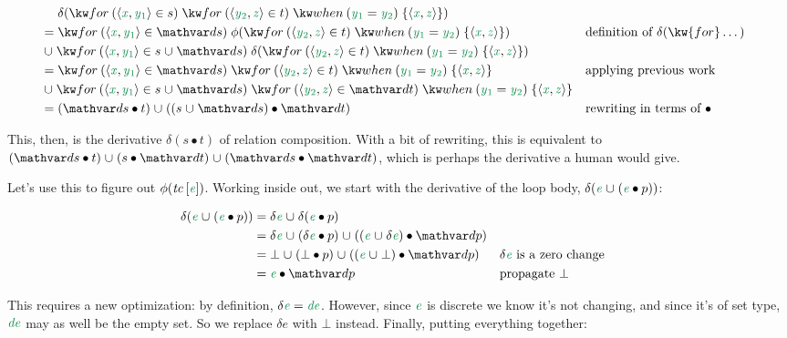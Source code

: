 \begin{align*}
  &\mathrel{\hphantom{=}}
  \delta(
  \eforraw{\etuple{\dvar x, \yone} \in s}
  \eforraw{\etuple{\ytwo, \dvar z} \in t}
  \ewhen{\yone = \ytwo} \esetraw{\etuple{\dvar x, \dvar z}})
  \\
  &= \eforraw{\etuple{\dvar x, \yone} \in \ds}
  \phi(\eforraw{\etuple{\ytwo, \dvar z} \in t}
  \ewhen{\yone = \ytwo} \esetraw{\etuple{\dvar x, \dvar z}})
  && \text{definition of $\delta(\kw{for} \dots)$}
  \\
  &\cup \eforraw{\etuple{\dvar x, \yone} \in s \cup \ds}
  \delta(\eforraw{\etuple{\ytwo, \dvar z} \in t}
  \ewhen{\yone = \ytwo} \esetraw{\etuple{\dvar x, \dvar z}})
  \\
  &= \eforraw{\etuple{\dvar x, \yone} \in \ds}
  \eforraw{\etuple{\ytwo, \dvar z} \in t}
  \ewhen{\yone = \ytwo} \esetraw{\etuple{\dvar x, \dvar z}}
  && \text{applying previous work}
  \\
  &\cup
  \eforraw{\etuple{\dvar x, \yone} \in s \cup \ds}
  \eforraw{\etuple{\ytwo, \dvar z} \in \dt}
  \ewhen{\yone = \ytwo} \esetraw{\etuple{\dvar x, \dvar z}}
  \\
  &= (\ds \bullet t) \cup ((s \cup \ds) \bullet \dt)
  && \text{rewriting in terms of ${\bullet}$}
\end{align*}

\noindent
This, then, is the derivative $\delta(s \bullet t)$ of relation composition.
With a bit of rewriting, this is equivalent to $(\ds \bullet t) \cup (s \bullet
\dt) \cup (\ds \bullet \dt)$, which is perhaps the derivative a human would
give.

Let's use this to figure out $\phi(\name{tc}\<\eboxvar{e})$. Working inside out,
we start with the derivative of the loop body, $\delta(\dvar e \cup (\dvar e
\bullet p))$:

\begin{align*}
  \delta({\dvar e \cup (\dvar e \bullet p)})
  &= \delta\dvar e \cup \delta(\dvar e \bullet p)\\
  &= \delta\dvar e
  \cup (\delta\dvar e \bullet p)
  \cup ((\dvar e \cup \delta\dvar e) \bullet \deep)
  \\
  &= \bot \cup (\bot \bullet p) \cup ((\dvar e \cup \bot) \bullet \deep)
  && \delta\dvar e ~\text{is a zero change}
  \\
  &= \dvar e \bullet \deep
  && \text{propagate}~\bot
\end{align*}

\noindent
This requires a new optimization: by definition, $\delta\dvar e = \dvar{de}$.
However, since $\dvar e$ is discrete we know it's not changing, and since it's
of set type, $\dvar{de}$ may as well be the empty set. So we replace $\delta e$
with $\bot$ instead.
%
Finally, putting everything together:

